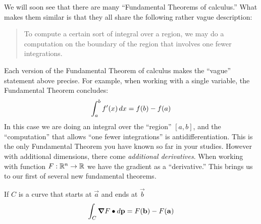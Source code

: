 \documentclass{ximera}
\begin{document}
We will soon see that there are many ``Fundamental Theorems of
calculus.'' What makes them similar is that they all share the
following rather vague description:
\begin{quote}
  To compute a certain sort of integral over a region, we may do a
  computation on the boundary of the region that involves one fewer
  integrations.
\end{quote}

Each version of the Fundamental Theorem of calculus makes the
``vague'' statement above precise. For example, when working with a
single variable, the Fundamental Theorem concludes:
\[
\int_a^b f'(x) \mathop{}\!d x = f(b) - f(a)
\]
In this case we are doing an integral over the ``region'' $[a,b]$, and
the ``computation'' that allows ``one fewer integrations'' is
antidifferentiation. This is the only Fundamental Theorem you have
known so far in your studies.  However with additional dimensions,
there come \textit{additional derivatives}. When working with function
$F:\mathbb R^n\to\mathbb R$ we have the gradient as a ``derivative.'' This brings us
to our first of several new fundamental theorems.

\begin{theorem}
  If $C$ is a curve that starts at $\vec{a}$ and ends at $\vec{b}$
  \[
  \int_C \boldsymbol\nabla F\bullet \mathop{}\!d \mathbf{p} = F(\mathbf{b}) - F(\mathbf{a})
  \]
\end{theorem}
\end{document}
